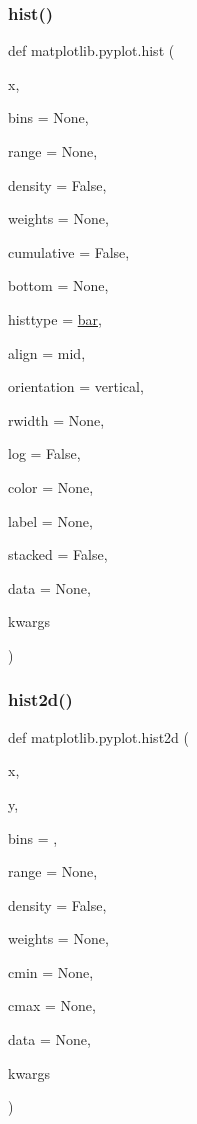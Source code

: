 \subsubsection{\texorpdfstring{hist()}{hist()}}
{\footnotesize\ttfamily def matplotlib.\+pyplot.\+hist (\begin{DoxyParamCaption}\item[{}]{x,  }\item[{}]{bins = {\ttfamily None},  }\item[{}]{range = {\ttfamily None},  }\item[{}]{density = {\ttfamily False},  }\item[{}]{weights = {\ttfamily None},  }\item[{}]{cumulative = {\ttfamily False},  }\item[{}]{bottom = {\ttfamily None},  }\item[{}]{histtype = {\ttfamily \textquotesingle{}\hyperlink{namespacematplotlib_1_1pyplot_ad38194863cb71209db712be324411404}{bar}\textquotesingle{}},  }\item[{}]{align = {\ttfamily \textquotesingle{}mid\textquotesingle{}},  }\item[{}]{orientation = {\ttfamily \textquotesingle{}vertical\textquotesingle{}},  }\item[{}]{rwidth = {\ttfamily None},  }\item[{}]{log = {\ttfamily False},  }\item[{}]{color = {\ttfamily None},  }\item[{}]{label = {\ttfamily None},  }\item[{}]{stacked = {\ttfamily False},  }\item[{}]{data = {\ttfamily None},  }\item[{}]{kwargs }\end{DoxyParamCaption})}

\mbox{\label{namespacematplotlib_1_1pyplot_a60fc925466142197bc8535d99dd03c93}} 
\subsubsection{\texorpdfstring{hist2d()}{hist2d()}}
{\footnotesize\ttfamily def matplotlib.\+pyplot.\+hist2d (\begin{DoxyParamCaption}\item[{}]{x,  }\item[{}]{y,  }\item[{}]{bins = {},  }\item[{}]{range = {\ttfamily None},  }\item[{}]{density = {\ttfamily False},  }\item[{}]{weights = {\ttfamily None},  }\item[{}]{cmin = {\ttfamily None},  }\item[{}]{cmax = {\ttfamily None},  }\item[{}]{data = {\ttfamily None},  }\item[{}]{kwargs }\end{DoxyParamCaption})}

